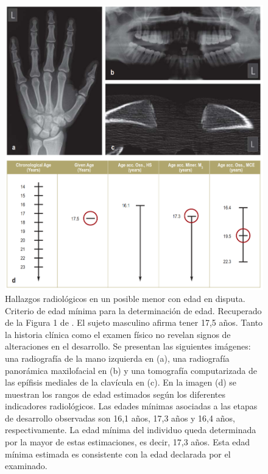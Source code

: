 \begin{figure}[H]
    \centering
    \includegraphics[width=\textwidth]{capitulos/cap_03/imagenes/X_ray_images.png}
    \caption[
        Hallazgos radiológicos en un posible menor con edad disputada: criterio de edad mínima para la
        determinación de edad. 
        Recuperado de la Figura 1 de \cite{schmeling2016}. 
    ]{
        Hallazgos radiológicos en un posible menor con edad en disputa. Criterio de edad mínima para la
        determinación de edad. 
        Recuperado de la Figura 1 de \cite{schmeling2016}. 
        El sujeto masculino afirma tener 17,5 años. Tanto la historia clínica como el examen físico no 
        revelan signos de alteraciones en el desarrollo. 
        Se presentan las siguientes imágenes: una radiografía de la mano izquierda en (a), una radiografía 
        panorámica maxilofacial en (b) y una tomografía computarizada de las epífisis mediales de la 
        clavícula en (c). En la imagen (d) se muestran los rangos de edad estimados según los diferentes 
        indicadores radiológicos.
        Las edades mínimas asociadas a las etapas de desarrollo observadas son 16,1 años, 17,3 años y 16,4 
        años, respectivamente. La edad mínima del individuo queda determinada por la mayor de estas 
        estimaciones, es decir, 17,3 años. Esta edad mínima estimada es consistente con la edad declarada 
        por el examinado.
    }
    \label{fig:x_ray_images}
\end{figure}



